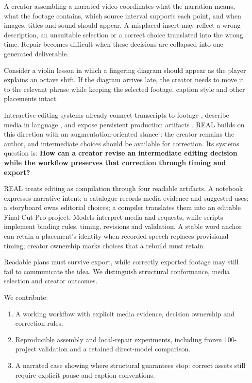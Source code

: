 \documentclass{ceurart}
\providecommand{\tightlist}{\setlength{\itemsep}{0pt}\setlength{\parskip}{0pt}}
\begin{document}
A creator assembling a narrated video coordinates what the narration
means, what the footage contains, which source interval supports each
point, and when images, titles and sound should appear. A misplaced
insert may reflect a wrong description, an unsuitable selection or a
correct choice translated into the wrong time. Repair becomes difficult
when these decisions are collapsed into one generated deliverable.

Consider a violin lesson in which a fingering diagram should appear as
the player explains an octave shift. If the diagram arrives late, the
creator needs to move it to the relevant phrase while keeping the
selected footage, caption style and other placements intact.

Interactive editing systems already connect transcripts to footage
\citep{truong2016quickcut, huber2019bscript}, describe media in language
\citep{wang2024lave}, and expose persistent production artifacts
\citep{yan2026crayotter}. REAL builds on this direction with an
augmentation-oriented stance \citep{brynjolfsson2022turing}: the creator
remains the author, and intermediate choices should be available for
correction. Its systems question is: \textbf{How can a creator revise an
intermediate editing decision while the workflow preserves that
correction through timing and export?}

REAL treats editing as compilation through four readable artifacts. A
notebook expresses narrative intent; a catalogue records media evidence
and suggested uses; a storyboard owns editorial choices; a compiler
translates them into an editable Final Cut Pro project. Models interpret
media and requests, while scripts implement binding rules, timing,
revisions and validation. A stable word anchor can retain a placement's
identity when recorded speech replaces provisional timing; creator
ownership marks choices that a rebuild must retain.

Readable plans must survive export, while correctly exported footage may
still fail to communicate the idea. We distinguish structural
conformance, media selection and creator outcomes.

We contribute:

\begin{enumerate}
\def\labelenumi{\arabic{enumi}.}
\tightlist
\item
  A working workflow with explicit media evidence, decision ownership
  and correction rules.
\item
  Reproducible assembly and local-repair experiments, including frozen
  100-project validation and a retained direct-model comparison.
\item
  A narrated case showing where structural guarantees stop: correct
  assets still require explicit pause and caption conventions.
\end{enumerate}
\end{document}

